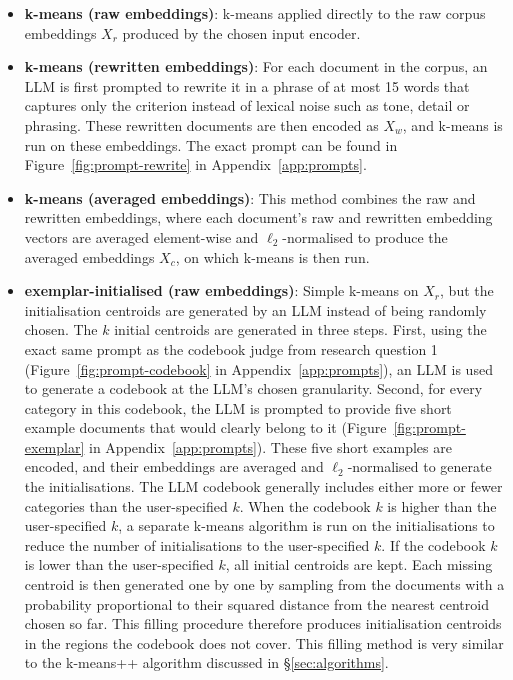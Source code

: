 \documentclass[11pt,a4paper,oneside]{report}
\begin{document}
\begin{itemize}
\item \textbf{k-means (raw embeddings)}: k-means applied directly to the raw corpus embeddings $X_r$ produced by the chosen input encoder.
\item \textbf{k-means (rewritten embeddings)}: For each document in the corpus, an LLM is first prompted to rewrite it in a phrase of at most 15 words that captures only the criterion instead of lexical noise such as tone, detail or phrasing. These rewritten documents are then encoded as $X_w$, and k-means is run on these embeddings. The exact prompt can be found in Figure~\ref{fig:prompt-rewrite} in Appendix~\ref{app:prompts}.
\item \textbf{k-means (averaged embeddings)}: This method combines the raw and rewritten embeddings, where each document's raw and rewritten embedding vectors are averaged element-wise and $\ell_2$-normalised to produce the averaged embeddings $X_c$, on which k-means is then run.
\item \textbf{exemplar-initialised (raw embeddings)}: Simple k-means on $X_r$, but the initialisation centroids are generated by an LLM instead of being randomly chosen. The $k$ initial centroids are generated in three steps. First, using the exact same prompt as the codebook judge from research question 1 (Figure~\ref{fig:prompt-codebook} in Appendix~\ref{app:prompts}), an LLM is used to generate a codebook at the LLM's chosen granularity. Second, for every category in this codebook, the LLM is prompted to provide five short example documents that would clearly belong to it (Figure~\ref{fig:prompt-exemplar} in Appendix~\ref{app:prompts}). These five short examples are encoded, and their embeddings are averaged and $\ell_2$-normalised to generate the initialisations. The LLM codebook generally includes either more or fewer categories than the user-specified $k$. When the codebook $k$ is higher than the user-specified $k$, a separate k-means algorithm is run on the initialisations to reduce the number of initialisations to the user-specified $k$. If the codebook $k$ is lower than the user-specified $k$, all initial centroids are kept. Each missing centroid is then generated one by one by sampling from the documents with a probability proportional to their squared distance from the nearest centroid chosen so far. This filling procedure therefore produces initialisation centroids in the regions the codebook does not cover. This filling method is very similar to the k-means++ algorithm discussed in \S\ref{sec:algorithms}.

\end{itemize}
\end{document}

